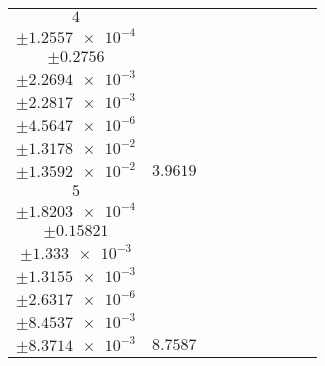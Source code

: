 \documentclass[8pt]{article}
\begin{document}
\begin{longtable}[l]{c c c c c c c c c}
$\num{4}$ & \begin{tabular}[c]{@{}c@{}}$\num{2.8286e-2}$ \\ $\pm\num{1.2557e-4}$\end{tabular} & \begin{tabular}[c]{@{}c@{}}$\num{4.4844e-2}$ \\ $\pm\num{0.2756}$\end{tabular} & \begin{tabular}[c]{@{}c@{}}$\num{5.7303}$ \\ $\pm\num{2.2694e-3}$\end{tabular} & \begin{tabular}[c]{@{}c@{}}$\num{1.8633e+3}$ \\ $\pm\num{2.2817e-3}$\end{tabular} & \begin{tabular}[c]{@{}c@{}}$\num{3.7276}$ \\ $\pm\num{4.5647e-6}$\end{tabular} & \begin{tabular}[c]{@{}c@{}}$\num{3.0577}$ \\ $\pm\num{1.3178e-2}$\end{tabular} & \begin{tabular}[c]{@{}c@{}}$\num{3.1111}$ \\ $\pm\num{1.3592e-2}$\end{tabular} & $\num{3.9619}$\\
$\num{5}$ & \begin{tabular}[c]{@{}c@{}}$\num{6.4157e-2}$ \\ $\pm\num{1.8203e-4}$\end{tabular} & \begin{tabular}[c]{@{}c@{}}$\num{7.0066e-5}$ \\ $\pm\num{0.15821}$\end{tabular} & \begin{tabular}[c]{@{}c@{}}$\num{7.4213}$ \\ $\pm\num{1.333e-3}$\end{tabular} & \begin{tabular}[c]{@{}c@{}}$\num{1.865e+3}$ \\ $\pm\num{1.3155e-3}$\end{tabular} & \begin{tabular}[c]{@{}c@{}}$\num{3.731}$ \\ $\pm\num{2.6317e-6}$\end{tabular} & \begin{tabular}[c]{@{}c@{}}$\num{3.4847}$ \\ $\pm\num{8.4537e-3}$\end{tabular} & \begin{tabular}[c]{@{}c@{}}$\num{3.4417}$ \\ $\pm\num{8.3714e-3}$\end{tabular} & $\num{8.7587}$\\

\end{longtable}
\end{document}
